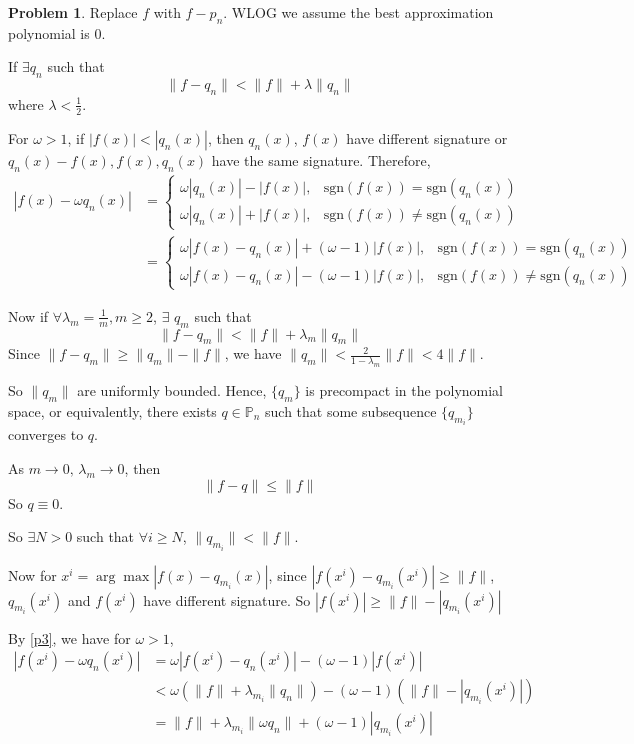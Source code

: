 \documentclass[a4paper]{article}
\theoremstyle{definition}
\newtheorem{problem}{Problem}
\theoremstyle{plain}
\newcommand{\Pbb}{\mathbb P}
\newcommand{\sgn}{\mathrm{sgn}}
\numberwithin{equation}{problem}
\begin{document}
\begin{problem}
    Replace  $ f $ with  $ f-p_n $. WLOG we assume the best approximation polynomial is 0.
    
    If  $ \exists q_n $ such that 
    \[\|f-q_n\|<\|f\|+\lambda\|q_n\|\]
    where  $ \lambda<\frac{1}{2} $.
    
    For  $\omega>1$,  if  $ |f(x)|<|q_n(x)| $, then  $ q_n(x) $,  $ f(x) $ have different signature or  $ q_n(x)-f(x),f(x),q_n(x) $ have the same signature. Therefore,
    \begin{equation}\label{p3}
        \begin{aligned}
            |f(x)-\omega q_n(x)|& =\begin{cases}
                \omega |q_n(x)|-|f(x)|,&\sgn(f(x))= \sgn(q_n(x))\\
                \omega |q_n(x)|+|f(x)|,&\sgn(f(x))\neq \sgn(q_n(x))
            \end{cases}\\
            & =\begin{cases}
                \omega|f(x)-q_n(x)|+(\omega-1)|f(x)|,&\sgn(f(x))= \sgn(q_n(x))\\
                \omega|f(x)-q_n(x)|-(\omega-1)|f(x)|,&\sgn(f(x))\neq \sgn(q_n(x))
            \end{cases}
        \end{aligned}
    \end{equation}
    
    Now if  $ \forall \lambda_m=\frac{1}{m},m \geq 2 $,   $ \exists  $ $ q_m $ such that 
    \[\|f-q_m\|<\|f\|+\lambda_m\|q_m\|\]
    Since  $ \|f-q_m\| \geq \|q_m\|-\|f\| $, we have  $ \|q_m\|<\frac{2}{1-\lambda_m}\|f\|<4\|f\| $.
    
    So  $ \|q_m\| $ are uniformly bounded. Hence,  $ \{q_m\} $ is precompact in the polynomial space, or equivalently, there exists  $ q\in \Pbb_n $ such that some subsequence  $ \{q_{m_i}\} $ converges to  $ q $.
    
    As  $ m\rightarrow0,\,\lambda_m\rightarrow0 $, then 
    \[\|f-q\| \leq \|f\|\]
    So  $ q\equiv 0 $. 
    
    So  $ \exists N>0 $ such that  $ \forall i \geq N $,  $ \|q_{m_i}\|<\|f\| $.
    
    Now for  $ x^i=\arg\max|f(x)-q_{m_i}(x)| $, since  $ |f(x^i)-q_{m_i}(x^i)| \geq \|f\| $,  $ q_{m_i}(x^i) $ and  $ f(x^i) $  have  different signature. So  $ |f(x^i)| \geq \|f\|-|q_{m_i}(x^i)| $ 
    
    By \eqref{p3}, we have for  $ \omega>1 $,
    \begin{align*}
        |f(x^i)-\omega q_n(x^i)|&=\omega|f(x^i)-q_n(x^i)|-(\omega-1)|f(x^i)|\\
        &<\omega(\|f\|+\lambda_{m_i}\|q_n\|)-(\omega-1)(\|f\|-|q_{m_i}(x^i)|)\\
        &=\|f\|+\lambda_{m_i}\|\omega q_n\|+(\omega-1)|q_{m_i}(x^i)|
    \end{align*}
    
\end{problem}
\end{document}
